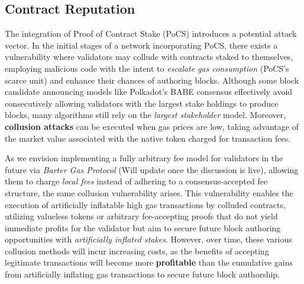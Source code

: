 \documentclass{article}
\begin{document}
\subsection{Contract Reputation}

The integration of Proof of Contract Stake (PoCS) introduces a potential attack vector. In the initial stages of a network incorporating PoCS, there exists a vulnerability where validators may collude with contracts staked to themselves, employing malicious code with the intent to \textit{escalate gas consumption} (PoCS's scarce unit) and enhance their chances of authoring blocks. Although some block candidate announcing models like Polkadot's BABE consensus effectively avoid consecutively allowing validators with the largest stake holdings to produce blocks, many algorithms still rely on the \textit{largest stakeholder} model. Moreover, \textbf{collusion attacks} can be executed when gas prices are low, taking advantage of the market value associated with the native token charged for transaction fees.

As we envision implementing a fully arbitrary fee model for validators in the future via \textit{Barter Gas Protocol} (Will update once the discussion is live), allowing them to charge \textit{local fees} instead of adhering to a consensus-accepted fee structure, the same collusion vulnerability arises. This vulnerability enables the execution of artificially inflatable high gas transactions by colluded contracts, utilizing valueless tokens or arbitrary fee-accepting proofs that do not yield immediate profits for the validator but aim to secure future block authoring opportunities with \textit{artificially inflated stakes}. However, over time, these various collusion methods will incur increasing costs, as the benefits of accepting legitimate transactions will become more \textbf{profitable} than the cumulative gains from artificially inflating gas transactions to secure future block authorship.
\end{document}

